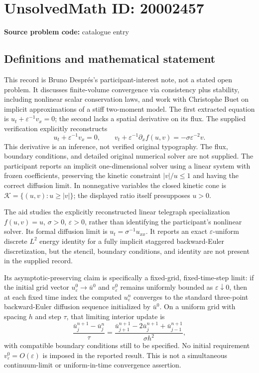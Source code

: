 \documentclass[11pt]{article}
\newcommand{\eps}{\varepsilon}
\begin{document}
\section*{UnsolvedMath ID: 20002457}
\textbf{Source problem code:} catalogue entry
\subsection{Definitions and mathematical statement}
This record is Bruno Despr\'es's participant-interest note, not a stated open problem. It discusses finite-volume convergence via consistency plus stability, including nonlinear scalar conservation laws, and work with Christophe Buet on implicit approximations of a stiff two-moment model. The first extracted equation is $u_t+\eps^{-1}v_x=0$; the second lacks a spatial derivative on its flux. The supplied verification explicitly reconstructs
\[
 u_t+\eps^{-1}v_x=0,\qquad
 v_t+\eps^{-1}\partial_x f(u,v)=-\sigma\eps^{-2}v.
\]
This derivative is an inference, not verified original typography. The flux, boundary conditions, and detailed original numerical solver are not supplied. The participant reports an implicit one-dimensional solver using a linear system with frozen coefficients, preserving the kinetic constraint $|v|/u\le1$ and having the correct diffusion limit. In nonnegative variables the closed kinetic cone is $\mathcal K=\{(u,v):u\ge|v|\}$; the displayed ratio itself presupposes $u>0$.

The aid studies the explicitly reconstructed linear telegraph specialization $f(u,v)=u$, $\sigma>0$, $\eps>0$, rather than identifying the participant's nonlinear solver. Its formal diffusion limit is $u_t=\sigma^{-1}u_{xx}$. It reports an exact $\eps$-uniform discrete $L^2$ energy identity for a fully implicit staggered backward-Euler discretization, but the stencil, boundary conditions, and identity are not present in the supplied record.

Its asymptotic-preserving claim is specifically a fixed-grid, fixed-time-step limit: if the initial grid vector $u_\eps^0\to\bar u^0$ and $v_\eps^0$ remains uniformly bounded as $\eps\downarrow0$, then at each fixed time index the computed $u_\eps^n$ converges to the standard three-point backward-Euler diffusion sequence initialized by $\bar u^0$. On a uniform grid with spacing $h$ and step $\tau$, that limiting interior update is
\[
 \frac{\bar u_j^{n+1}-\bar u_j^n}{\tau}
 =\frac{\bar u_{j+1}^{n+1}-2\bar u_j^{n+1}+\bar u_{j-1}^{n+1}}{\sigma h^2},
\]
with compatible boundary conditions still to be specified. No initial requirement $v_\eps^0=O(\eps)$ is imposed in the reported result. This is not a simultaneous continuum-limit or uniform-in-time convergence assertion.
\end{document}
